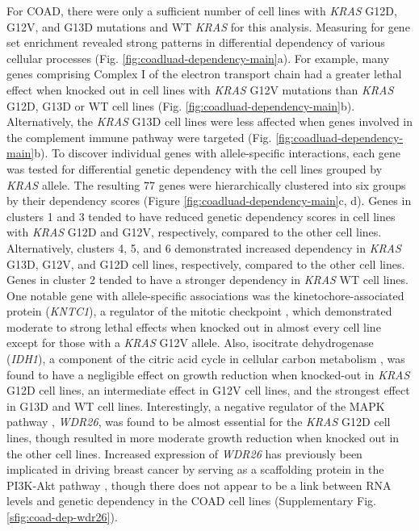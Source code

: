 \documentclass[english, 10pt, letterpaper]{article}
\newcommand{\KRAS}{\emph{KRAS}}
\begin{document}
For COAD, there were only a sufficient number of cell lines with \KRAS{} G12D, G12V, and G13D mutations and WT \KRAS{} for this analysis.
Measuring for gene set enrichment revealed strong patterns in differential dependency of various cellular processes (Fig. \ref{fig:coadluad-dependency-main}a).
For example, many genes comprising Complex I of the electron transport chain had a greater lethal effect when knocked out in cell lines with \KRAS{} G12V mutations than \KRAS{} G12D, G13D or WT cell lines (Fig. \ref{fig:coadluad-dependency-main}b).
Alternatively, the \KRAS{} G13D cell lines were less affected when genes involved in the complement immune pathway were targeted (Fig. \ref{fig:coadluad-dependency-main}b).
To discover individual genes with allele-specific interactions, each gene was tested for differential genetic dependency with the cell lines grouped by \KRAS{} allele.
The resulting 77 genes were hierarchically clustered into six groups by their dependency scores (Figure \ref{fig:coadluad-dependency-main}c, d).
Genes in clusters 1 and 3 tended to have reduced genetic dependency scores in cell lines with \KRAS{} G12D and G12V, respectively, compared to the other cell lines.
Alternatively, clusters 4, 5, and 6 demonstrated increased dependency in \KRAS{} G13D, G12V, and G12D cell lines, respectively, compared to the other cell lines.
Genes in cluster 2 tended to have a stronger dependency in \KRAS{} WT cell lines.
One notable gene with allele-specific associations was the kinetochore-associated protein (\emph{KNTC1}), a regulator of the mitotic checkpoint \cite{Chan2000HumanKinetochores., Scaerou2001TheKinetochore., Kops2005ZW10Kinetochore.}, which demonstrated moderate to strong lethal effects when knocked out in almost every cell line except for those with a \KRAS{} G12V allele.
Also, isocitrate dehydrogenase (\emph{IDH1}), a component of the citric acid cycle in cellular carbon metabolism \cite{Geisbrecht1999TheDehydrogenase.}, was found to have a negligible effect on growth reduction when knocked-out in \KRAS{} G12D cell lines, an intermediate effect in G12V cell lines, and the strongest effect in G13D and WT cell lines.
Interestingly, a negative regulator of the MAPK pathway \cite{Goto2016WDR26Pathway.}, \emph{WDR26}, was found to be almost essential for the \KRAS{} G12D cell lines, though resulted in more moderate growth reduction when knocked out in the other cell lines.
Increased expression of \emph{WDR26} has previously been implicated in driving breast cancer by serving as a scaffolding protein in the PI3K-Akt pathway \cite{Ye2016UpregulatedInvasion.}, though there does not appear to be a link between RNA levels and genetic dependency in the COAD cell lines (Supplementary Fig. \ref{sfig:coad-dep-wdr26}).
\end{document}
